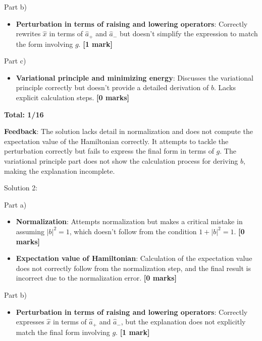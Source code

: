 \documentclass[a4paper,11pt]{article}
\begin{document}
Part b)

\begin{itemize}
    \item \textbf{Perturbation in terms of raising and lowering operators}: Correctly rewrites \( \hat{x} \) in terms of \( \hat{a}_{+} \) and \( \hat{a}_{-} \) but doesn't simplify the expression to match the form involving \(g\). \textbf{[1 mark]}
\end{itemize}

Part c)

\begin{itemize}
    \item \textbf{Variational principle and minimizing energy}: Discusses the variational principle correctly but doesn't provide a detailed derivation of \(b\). Lacks explicit calculation steps. \textbf{[0 marks]}
\end{itemize}

\textbf{Total: 1/16}

\textbf{Feedback}: The solution lacks detail in normalization and does not compute the expectation value of the Hamiltonian correctly. It attempts to tackle the perturbation correctly but fails to express the final form in terms of \(g\). The variational principle part does not show the calculation process for deriving \(b\), making the explanation incomplete.

Solution 2:

Part a)

\begin{itemize}
    \item \textbf{Normalization}: Attempts normalization but makes a critical mistake in assuming \(|b|^2 = 1\), which doesn't follow from the condition \(1 + |b|^2 = 1\). \textbf{[0 marks]}
    \item \textbf{Expectation value of Hamiltonian}: Calculation of the expectation value does not correctly follow from the normalization step, and the final result is incorrect due to the normalization error. \textbf{[0 marks]}
\end{itemize}

Part b)

\begin{itemize}
    \item \textbf{Perturbation in terms of raising and lowering operators}: Correctly expresses \( \hat{x} \) in terms of \( \hat{a}_{+} \) and \( \hat{a}_{-} \), but the explanation does not explicitly match the final form involving \(g\). \textbf{[1 mark]}
\end{itemize}
\end{document}
